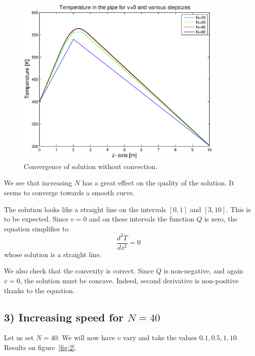 \documentclass[11pt,a4paper]{report}
\begin{document}
\begin{figure}[!h]
\centering
\includegraphics[width = 0.9\textwidth]{./fig1.eps}
\caption{Convergence of solution without convection.}
\label{fig:1}
\end{figure}

We see that increasing $N$ has a great effect on the quality of the solution. It seems to converge towards a smooth curve.

The solution looks like a straight line on the intervals $[0,1]$ and $[3,10]$. This is to be expected. Since $v=0$ and on these intervals the function $Q$ is zero, the equation simplifies to $$\dfrac{d^{2}T}{dz^{2}}=0$$ whose solution is a straight line.

We also check that the convexity is correct. Since $Q$ is non-negative, and again $v=0$, the solution must be concave. Indeed, second derivative is non-positive thanks to the equation.

\subsection*{3) Increasing speed for $N=40$}

Let us set $N=40$. We will now have $v$ vary and take the values $0.1, 0.5, 1,10$. Results on figure~\ref{fig:2}.
\end{document}
